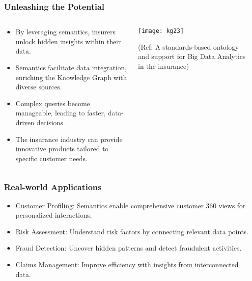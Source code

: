 \begin{frame}[fragile]\frametitle{Unleashing the Potential}

\begin{columns}
    \begin{column}[T]{0.6\linewidth}
		  \begin{itemize}
			\item By leveraging semantics, insurers unlock hidden insights within their data.
			\item Semantics facilitate data integration, enriching the Knowledge Graph with diverse sources.
			\item Complex queries become manageable, leading to faster, data-driven decisions.
			\item The insurance industry can provide innovative products tailored to specific customer needs.
		  \end{itemize}
    \end{column}
    \begin{column}[T]{0.4\linewidth}  
		\begin{center}
		\texttt{[image: kg23]}

		{\tiny (Ref: A standards-based ontology and support for Big Data Analytics in the insurance)}
		\end{center}    
    \end{column}
  \end{columns}
\end{frame}

\begin{frame}[fragile]\frametitle{Real-world Applications}
  \begin{itemize}
    \item Customer Profiling: Semantics enable comprehensive customer 360 views for personalized interactions.
    \item Risk Assessment: Understand risk factors by connecting relevant data points.
    \item Fraud Detection: Uncover hidden patterns and detect fraudulent activities.
    \item Claims Management: Improve efficiency with insights from interconnected data.
  \end{itemize}
\end{frame}


